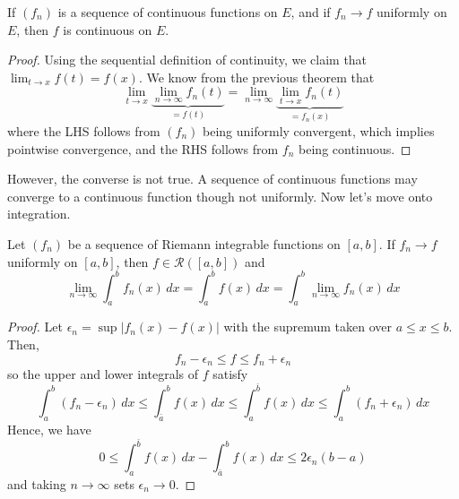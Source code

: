   \begin{corollary}
    If $(f_n)$ is a sequence of continuous functions on $E$, and if $f_n \to f$ uniformly on $E$, then $f$ is continuous on $E$. 
  \end{corollary}
  \begin{proof}
    Using the sequential definition of continuity, we claim that $\lim_{t \to x} f(t) = f(x)$. We know from the previous theorem that 
    \begin{equation}
      \lim_{t \to x} \underbrace{\lim_{n \to \infty} f_n (t)}_{= f(t)} = \lim_{n \to \infty} \underbrace{\lim_{t \to x} f_n (t)}_{= f_n (x)}
    \end{equation}
    where the LHS follows from $(f_n)$ being uniformly convergent, which implies pointwise convergence, and the RHS follows from $f_n$ being continuous.  
  \end{proof} 

  However, the converse is not true. A sequence of continuous functions may converge to a continuous function though not uniformly. Now let's move onto integration. 

  \begin{theorem}
    Let $(f_n)$ be a sequence of Riemann integrable functions on $[a, b]$. If $f_n \to f$ uniformly on $[a, b]$, then $f \in \mathcal{R}([a, b])$ and 
    \begin{equation}
      \lim_{n \to \infty} \int_a^b f_n(x) \,dx = \int_a^b f(x) \,dx = \int_a^b \lim_{n \to \infty} f_n (x) \,dx 
    \end{equation}
  \end{theorem} 
  \begin{proof}
    Let $\epsilon_n = \sup | f_n (x) - f(x)|$ with the supremum taken over $a \leq x \leq b$. Then, 
    \begin{equation}
      f_n - \epsilon_n \leq f \leq f_n + \epsilon_n
    \end{equation}
    so the upper and lower integrals of $f$ satisfy 
    \begin{equation}
      \int_a^b (f_n - \epsilon_n) \,dx \leq \int_{\bar{a}}^b f(x) \,dx \leq \int_a^{\bar{b}} f(x) \,dx \leq \int_a^b (f_n + \epsilon_n) \,dx
    \end{equation}
    Hence, we have 
    \begin{equation}
      0 \leq \int_a^{\bar{b}} f(x)\,dx - \int_{\bar{a}}^b f(x) \,dx \leq 2 \epsilon_n (b - a) 
    \end{equation}
    and taking $n \to \infty$ sets $\epsilon_n \to 0$. 
  \end{proof}

